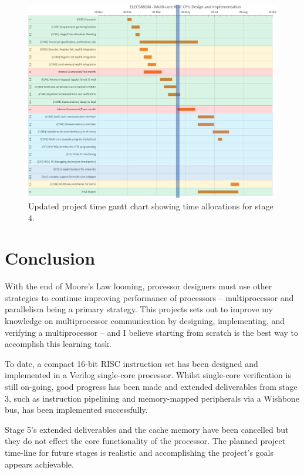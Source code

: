 \documentclass[11pt,a4paper]{report}
\begin{document}
{\begin{figure}[H]
\centering 
\includegraphics[width=12cm]{../img/week2_gantt}
\caption{Updated project time gantt chart showing time allocations for stage 4.}
\label{fig:future_stages}
\end{figure}

\chapter{Conclusion}
With the end of Moore's Law looming, processor designers must use other strategies to continue improving performance of processors -- multiprocessor and parallelism being a primary strategy. This projects sets out to improve my knowledge on multiprocessor communication by designing, implementing, and verifying a multiprocessor -- and I believe starting from scratch is the best way to accomplish this learning task.

To date, a compact 16-bit RISC instruction set has been designed and implemented in a Verilog single-core processor. Whilst single-core verification is still on-going, good progress has been made and extended deliverables from stage 3, such as instruction pipelining and memory-mapped peripherals via a Wishbone bus, has been implemented successfully.

Stage 5's extended deliverables and the cache memory have been cancelled but they do not effect the core functionality of the processor. 
The planned project time-line for future stages is  realistic and accomplishing the project's goals appears achievable.

\clearpage


}
\end{document}
